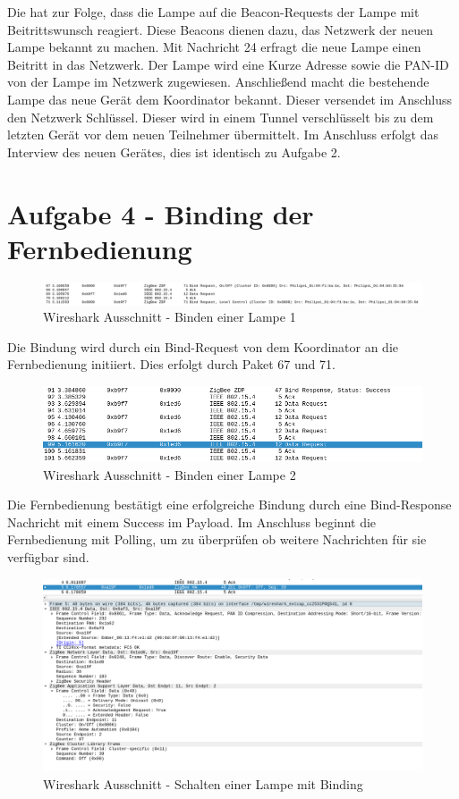 Die hat zur Folge, dass die Lampe auf die Beacon-Requests der Lampe mit Beitrittswunsch reagiert. Diese Beacons dienen dazu, das Netzwerk der neuen Lampe bekannt zu machen.
Mit Nachricht 24 erfragt die neue Lampe einen Beitritt in das Netzwerk. Der Lampe wird eine Kurze Adresse sowie die PAN-ID von der Lampe im Netzwerk zugewiesen. Anschließend 
macht die bestehende Lampe das neue Gerät dem Koordinator bekannt. Dieser versendet im Anschluss den Netzwerk Schlüssel. Dieser wird in einem Tunnel verschlüsselt bis zu dem letzten
Gerät vor dem neuen Teilnehmer übermittelt. Im Anschluss erfolgt das Interview des neuen Gerätes, dies ist identisch zu Aufgabe 2.

\section{Aufgabe 4 - Binding der Fernbedienung}

\begin{figure}[H]
    \centering
    \includegraphics[width=1\textwidth]{media/lsg-4-1.png}
    \caption{Wireshark Ausschnitt - Binden einer Lampe 1}
\end{figure}

Die Bindung wird durch ein Bind-Request von dem Koordinator an die Fernbedienung initiiert. Dies erfolgt durch Paket 67 und 71.

\begin{figure}[H]
    \centering
    \includegraphics[width=1\textwidth]{media/lsg-4-2.png}
    \caption{Wireshark Ausschnitt - Binden einer Lampe 2}
\end{figure}

Die Fernbedienung bestätigt eine erfolgreiche Bindung durch eine Bind-Response Nachricht mit einem \grqq Success\grqq{} im Payload.
Im Anschluss beginnt die Fernbedienung mit Polling, um zu überprüfen ob weitere Nachrichten für sie verfügbar sind.

\begin{figure}[H]
    \centering
    \includegraphics[width=1\textwidth]{media/lsg-4-3.png}
    \caption{Wireshark Ausschnitt - Schalten einer Lampe mit Binding}
\end{figure}

